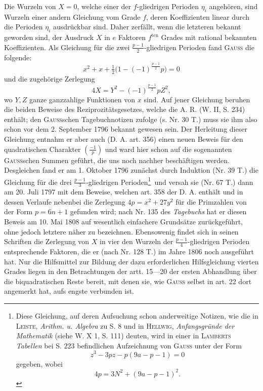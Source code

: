 Die Wurzeln von \(X=0\), welche einer der \(f\)-gliedrigen Perioden \(\eta_i\) angehören, sind Wurzeln einer andern Gleichung vom Grade \(f\), deren Koeffizienten linear durch die Perioden \(\eta_i\) ausdrückbar sind. Daher zerfällt, wenn die letzteren bekannt geworden sind, der Ausdruck \(X\) in \(e\) Faktoren \(f^{\mathrm{ten}}\) Grades mit rational bekannten Koeffizienten. Als Gleichung für die zwei \(\frac{p-1}{2}\)-gliedrigen Perioden fand \textsc{Gauss} die folgende:
\[
x^2+x+\tfrac12\bigl(1-(-1)^{\frac{p-1}{2}}p\bigr)=0
\]
und die zugehörige Zerlegung
\[
4X=Y^2-(-1)^{\frac{p-1}{2}}pZ^2,
\]
wo \(Y,Z\) ganze ganzzahlige Funktionen von \(x\) sind. Auf jener Gleichung beruhen die beiden Beweise des Reziprozitätsgesetzes, welche die A. R. (W. II, S. 234) enthält; den \textsc{Gauss}schen Tagebuchnotizen zufolge (s. Nr. 30 T.) muss sie ihm also schon vor dem 2. September 1796 bekannt gewesen sein. Der Herleitung dieser Gleichung entnahm er aber auch (D. A. art. 356) einen neuen Beweis für den quadratischen Charakter \(\left(\frac{-1}{p}\right)\) und ward hier schon auf die sogenannten \textsc{Gauss}schen Summen geführt, die uns noch nachher beschäftigen werden. Desgleichen fand er am 1. Oktober 1796 zunächst durch Induktion (Nr. 39 T.) die Gleichung für die drei \(\frac{p-1}{3}\)-gliedrigen Perioden\footnote{Diese Gleichung, auf deren Aufsuchung schon anderweitige Notizen, wie die in \textsc{Leiste}, \textit{Arithm. u. Algebra} zu S. 8 und in \textsc{Hellwig}, \textit{Anfangsgründe der Mathematik} (siehe W. X 1, S. 111) deuten, wird in einer in \textsc{Lamberts} \textit{Tabellen} bei S. 223 befindlichen Aufzeichnung von \textsc{Gauss} unter der Form
\[
z^3-3pz-p(9a-p-1)=0
\]
gegeben, wobei
\[
4p=3N^2+(9a-p-1)^2.
\]
}\ und versah sie (Nr. 67 T.) dann am 20. Juli 1797 mit dem Beweise, welchen art. 358 der D. A. enthält und in dessen Verlaufe nebenbei die Zerlegung
\newpage{}
\noindent \(4p=x^2+27y^2\) für die Primzahlen von der Form \(p=6n+1\) gefunden wird; nach Nr. 135 des \textit{Tagebuchs} hat er diesen Beweis am 10. Mai 1808 auf wesentlich einfachere Grundsätze zurückgeführt, ohne jedoch letztere näher zu bezeichnen. Ebensowenig findet sich in seinen Schriften die Zerlegung von \(X\) in vier den Wurzeln der \(\frac{p-1}{4}\)-gliedrigen Perioden entsprechende Faktoren, die er (nach Nr. 128 T.) im Jahre 1806 noch ausgeführt hat. Nur die Hilfsmittel zur Bildung der dazu erforderlichen Hilfsgleichung vierten Grades liegen in den Betrachtungen der artt. 15—20 der ersten Abhandlung über die biquadratischen Reste bereit, mit denen sie, wie \textsc{Gauss} selbst in art. 22 dort angemerkt hat, aufs engste verbunden ist.

